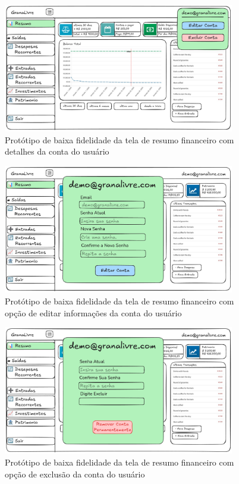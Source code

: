 \begin{figure}[H]
    \centering
    \includegraphics[width=0.9\textwidth]{imgs/03-resumo2.png}
    \caption{Protótipo de baixa fidelidade da tela de resumo financeiro com detalhes da conta do usuário}
    \label{fig:prot_resumo2}
\end{figure}

\begin{figure}[H]
    \centering
    \includegraphics[width=0.9\textwidth]{imgs/03-resumo3.png}
    \caption{Protótipo de baixa fidelidade da tela de resumo financeiro com opção de editar informações da conta do usuário}
    \label{fig:prot_resumo3}
\end{figure}

\begin{figure}[H]
    \centering
    \includegraphics[width=0.9\textwidth]{imgs/03-resumo4.png}
    \caption{Protótipo de baixa fidelidade da tela de resumo financeiro com opção de exclusão da conta do usuário}
    \label{fig:prot_resumo4}
\end{figure}

